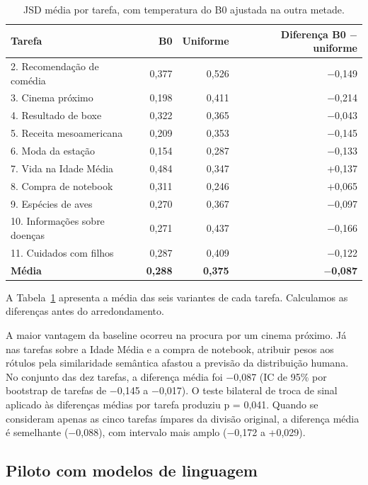 \documentclass[12pt]{article}
\begin{document}
\begin{table}[!htb]\centering\small\caption{JSD média por tarefa, com temperatura do B0 ajustada na outra metade.}\label{tab:b0}\begin{tabularx}{\linewidth}{@{}Xrrr@{}}\toprule
Tarefa & B0 & Uniforme & Diferença B0 $-$ uniforme \\ \midrule
2. Recomendação de comédia & 0,377 & 0,526 & $-$0,149 \\
3. Cinema próximo & 0,198 & 0,411 & $-$0,214 \\
4. Resultado de boxe & 0,322 & 0,365 & $-$0,043 \\
5. Receita mesoamericana & 0,209 & 0,353 & $-$0,145 \\
6. Moda da estação & 0,154 & 0,287 & $-$0,133 \\
7. Vida na Idade Média & 0,484 & 0,347 & +0,137 \\
8. Compra de notebook & 0,311 & 0,246 & +0,065 \\
9. Espécies de aves & 0,270 & 0,367 & $-$0,097 \\
10. Informações sobre doenças & 0,271 & 0,437 & $-$0,166 \\
11. Cuidados com filhos & 0,287 & 0,409 & $-$0,122 \\
\textbf{Média} & \textbf{0,288} & \textbf{0,375} & \textbf{$-$0,087} \\\bottomrule\end{tabularx}\end{table}

A Tabela~\ref{tab:b0} apresenta a média das seis variantes de cada tarefa. Calculamos as diferenças antes do arredondamento.

A maior vantagem da baseline ocorreu na procura por um cinema próximo. Já nas tarefas sobre a Idade Média e a compra de notebook, atribuir pesos aos rótulos pela similaridade semântica afastou a previsão da distribuição humana. No conjunto das dez tarefas, a diferença média foi $-$0,087 (IC de 95\% por bootstrap de tarefas de $-$0,145 a $-$0,017). O teste bilateral de troca de sinal aplicado às diferenças médias por tarefa produziu p = 0,041. Quando se consideram apenas as cinco tarefas ímpares da divisão original, a diferença média é semelhante ($-$0,088), com intervalo mais amplo ($-$0,172 a +0,029).

\subsection{Piloto com modelos de linguagem}
\end{document}
